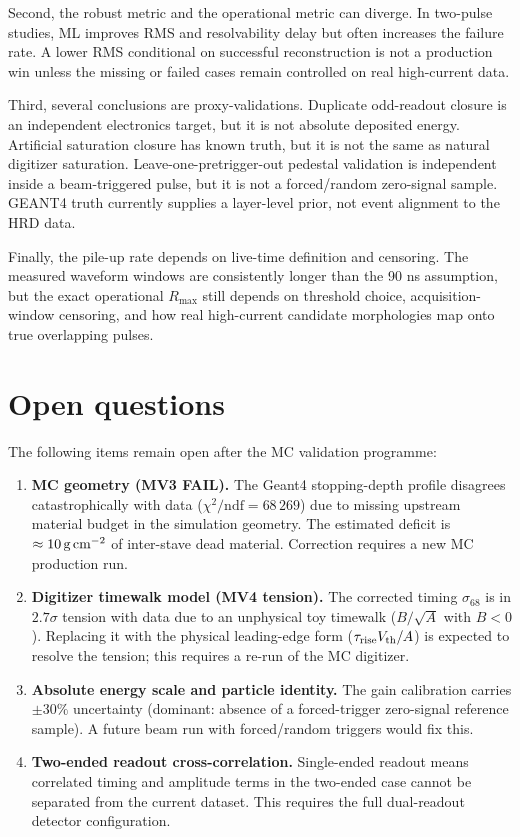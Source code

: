 Second, the robust metric and the operational metric can diverge.  In two-pulse
studies, ML improves RMS and resolvability delay but often increases the failure
rate.  A lower RMS conditional on successful reconstruction is not a production win
unless the missing or failed cases remain controlled on real high-current data.

Third, several conclusions are proxy-validations.  Duplicate odd-readout closure is
an independent electronics target, but it is not absolute deposited energy.  Artificial
saturation closure has known truth, but it is not the same as natural digitizer
saturation.  Leave-one-pretrigger-out pedestal validation is independent inside a
beam-triggered pulse, but it is not a forced/random zero-signal sample.  GEANT4 truth
currently supplies a layer-level prior, not event alignment to the HRD data.

Finally, the pile-up rate depends on live-time definition and censoring.  The measured
waveform windows are consistently longer than the 90 ns assumption, but the exact
operational \(R_{\max}\) still depends on threshold choice, acquisition-window
censoring, and how real high-current candidate morphologies map onto true overlapping
pulses.

\section{Open questions}

The following items remain open after the MC validation programme:

\begin{enumerate}
\item \textbf{MC geometry (MV3 FAIL).} The Geant4 stopping-depth profile
  disagrees catastrophically with data ($\chi^2/\text{ndf} = 68\,269$)
  due to missing upstream material budget in the simulation geometry.
  The estimated deficit is $\approx 10\,\text{g\,cm}^{-2}$ of inter-stave
  dead material. Correction requires a new MC production run.

\item \textbf{Digitizer timewalk model (MV4 tension).} The corrected timing
  $\sigma_{68}$ is in $2.7\sigma$ tension with data due to an unphysical
  toy timewalk ($B/\sqrt{A}$ with $B<0$). Replacing it with the physical
  leading-edge form ($\tau_{\rm rise}V_{\rm th}/A$) is expected to resolve
  the tension; this requires a re-run of the MC digitizer.

\item \textbf{Absolute energy scale and particle identity.} The gain
  calibration carries $\pm 30\%$ uncertainty (dominant: absence of a
  forced-trigger zero-signal reference sample). A future beam run with
  forced/random triggers would fix this.

\item \textbf{Two-ended readout cross-correlation.} Single-ended readout means
  correlated timing and amplitude terms in the two-ended case cannot be
  separated from the current dataset. This requires the full dual-readout
  detector configuration.
\end{enumerate}


